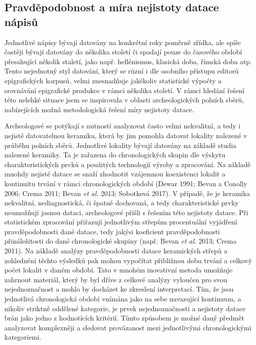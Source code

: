 
\subsection[pravděpodobnost-a-míra-nejistoty-datace-nápisů]{Pravděpodobnost a míra nejistoty datace nápisů}

Jednotlivé nápisy bývají datovány na konkrétní roky poměrně zřídka, ale spíše častěji bývají datovány do několika století či spadají pouze do časového období přesahující několik staletí, jako např. hellénismus, klasická doba, římská doba atp. Tento nejednotný styl datování, který se různí i dle osobního přístupu editorů epigrafických korpusů, velmi znesnadňuje jakékoliv statistické výpočty a srovnávání epigrafické produkce v rámci několika století. V rámci hledání řešení této nelehké situace jsem se inspirovala v oblasti archeologických polních sběrů, nabízejících možná metodologická řešení míry nejistoty datace.

Archeologové se potýkají s nutností analyzovat často velmi nekvalitní, a tedy i nejistě datovatelnou keramiku, která by jim pomohla datovat lokality nalezené v průběhu polních sběrů. Jednotlivé lokality bývají datovány na základě studia nalezené keramiky. Ta je zařazena do chronologických skupin dle výskytu charakteristických prvků a použitých technologií výroby a zpracování. Na základě mnohdy nejisté datace se snaží zhodnotit vzájemnou koexistenci lokalit a kontinuitu trvání v rámci chronologických období (Dewar 1991; Bevan a Conolly 2006; Crema 2011; Bevan {\em et al.} 2013; Sobotková 2017). V případě, že je keramika nekvalitní, nediagnostická, či špatně dochovaná, a tedy charakteristické prvky neumožňují jasnou dataci, archeologové přišli s řešením této nejistoty datace. Při statistickém zpracování přiřazují jednotlivým střepům procentuální vyjádření pravděpodobnosti dané datace, tedy jakýsi koeficient pravděpodobnosti přináležitosti do dané chronologické skupiny (např. Bevan {\em et al.} 2013; Crema 2011). Na základě analýzy pravděpodobnosti datace keramických střepů a zohlednění těchto výsledků pak mohou vypočítat přibližnou dobu trvání a celkový počet lokalit v daném období. Tato v mnohém inovativní metoda umožňuje zahrnout materiál, který by byl dříve z celkové analýzy vyloučen pro svou nejednoznačnost a mohlo by docházet ke zkreslení interpretací. Tím, že jsou jednotlivá chronologická období vnímána jako na sebe navazující kontinuum, a nikoliv striktně oddělené kategorie, je prvek nejednoznačnosti a nejistoty datace brán jako jedno z hodnotících kritérií. Tímto způsobem je možné daný předmět analyzovat komplexněji a sledovat provázanost mezi jednotlivými chronologickými kategoriemi.

